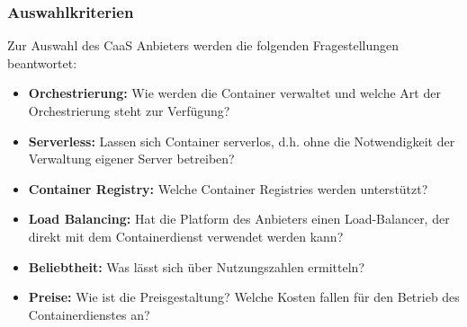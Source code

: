 \subsubsection{Auswahlkriterien}\label{caas_kriterien}

Zur Auswahl des CaaS Anbieters werden die folgenden Fragestellungen beantwortet:


\begin{itemize}
    \item \textbf{Orchestrierung:}
    Wie werden die Container verwaltet und welche Art der Orchestrierung steht zur Verfügung?

    \item \textbf{Serverless:}
    Lassen sich Container serverlos, d.h. ohne die Notwendigkeit der Verwaltung eigener Server betreiben?

    \item \textbf{Container Registry:}
    Welche Container Registries werden unterstützt?

    \item \textbf{Load Balancing:}
    Hat die Platform des Anbieters einen Load-Balancer, der direkt mit dem Containerdienst verwendet werden kann?

    \item \textbf{Beliebtheit:}
    Was lässt sich über Nutzungszahlen ermitteln?

    \item \textbf{Preise:}
    Wie ist die Preisgestaltung?
    Welche Kosten fallen für den Betrieb des Containerdienstes an?
\end{itemize}
